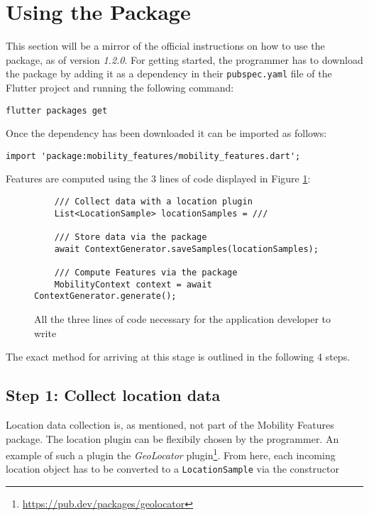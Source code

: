 \section{Using the Package}
This section will be a mirror of the official instructions on how to use the package, as of version \textit{1.2.0}. For getting started, the programmer has to download the package by adding it as a dependency in their \verb|pubspec.yaml| file of the Flutter project and running the following command:

\begin{verbatim}
flutter packages get
\end{verbatim}

Once the dependency has been downloaded it can be imported as follows:

\begin{verbatim}
import 'package:mobility_features/mobility_features.dart';
\end{verbatim}

Features are computed using the 3 lines of code displayed in Figure \ref{fig:code-example-intro}:

\begin{figure}[h]
    \centering
    \begin{verbatim}
    /// Collect data with a location plugin
    List<LocationSample> locationSamples = ///

    /// Store data via the package
    await ContextGenerator.saveSamples(locationSamples);
    
    /// Compute Features via the package
    MobilityContext context = await ContextGenerator.generate();
    \end{verbatim}
    \caption{All the three lines of code necessary for the application developer to write}
    \label{fig:code-example-intro}
\end{figure}

The exact method for arriving at this stage is outlined in the following 4 steps.

\subsection*{Step 1: Collect location data}
Location data collection is, as mentioned, not part of the Mobility Features package. The location plugin can be flexibily chosen by the programmer. An example of such a plugin the \textit{GeoLocator} plugin\footnote{\url{https://pub.dev/packages/geolocator}}. From here, each incoming location object has to be converted to a \verb|LocationSample| via the constructor


